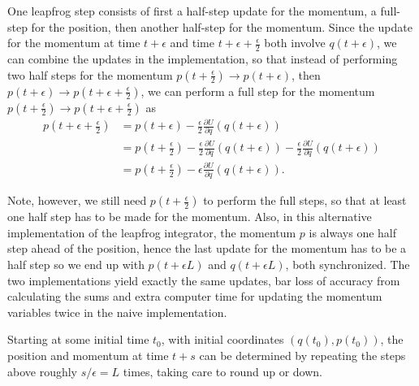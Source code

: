 \documentclass[12pt]{report}
\begin{document}
One leapfrog step consists of first a half-step update for the momentum, a full-step
for the position, then another half-step for the momentum. Since the update for the momentum
at time $t+\epsilon$ and time $t+\epsilon + \frac{\epsilon}{2}$ both involve
$q(t+\epsilon)$,  we can combine the updates in the implementation, so that instead of performing two half steps for the momentum $p(t+\frac{\epsilon}{2}) \rightarrow p(t+\epsilon)$, then $ p(t+\epsilon) \rightarrow p\left(t+\epsilon + \frac{\epsilon}{2}\right)$, we can perform a full step for the momentum $p(t+\frac{\epsilon}{2}) \rightarrow p(t+ \epsilon + \frac{\epsilon}{2}) $ as 
\begin{align}
p\left(t+\epsilon + \frac{\epsilon}{2}\right)  
&= p(t+\epsilon) - \frac{\epsilon}{2} \frac{\partial U}{\partial q }(q(t+\epsilon)) \\
&= p\left(t+\frac{\epsilon}{2}\right) - \frac{\epsilon}{2} \frac{\partial U}{\partial q }(q(t+\epsilon)) - \frac{\epsilon}{2} \frac{\partial U}{\partial q }(q(t+\epsilon)) \\
&= p\left(t+\frac{\epsilon}{2}\right) - \epsilon \frac{\partial U}{\partial q }(q(t+\epsilon)).
\end{align}

Note, however, we still need $p(t+\frac{\epsilon}{2})$ to perform the full
steps, so that at least one half step has to be made for the momentum. Also, in
this alternative implementation of the leapfrog integrator, the momentum $p$ is
always one half step ahead of the position, hence the last update for the momentum has
to be a half step so we end up with $p(t+\epsilon L)$ and $q(t+\epsilon L )$,
both synchronized. The two implementations yield exactly the same updates, bar
loss of accuracy from calculating the sums and extra computer time for updating
the momentum variables twice in the naive implementation. 

Starting at some initial time $t_0$, with initial coordinates $(q(t_0),p(t_0))$, the position and momentum at time $t+s$ can be determined by repeating the steps above roughly $s/\epsilon = L$ times, taking care to round up or down. 
\end{document}
